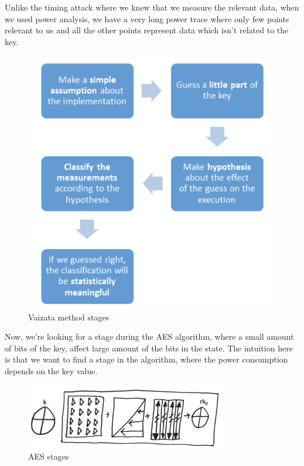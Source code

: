 Unlike the timing attack where we knew that we measure the relevant data, when we used power analysis, we have a very long power trace where only few points relevant to us and all the other points represent data which isn't related to the key.

\begin{figure}[!ht]
    \centering
    \includegraphics[height=0.9\textwidth]{images/Lecture6/vaizata.png}
    \caption{Vaizata method stages} \label{fig:vaizata}
\end{figure}

Now, we're looking for a stage during the AES algorithm, where a small amount of bits of the key, affect large amount of the bits in the state. The intuition here is that we want to find a stage in the algorithm, where the power consumption depends on the key value.

\begin{figure}[!ht]
    \centering
    \includegraphics[width=0.8\textwidth]{images/Lecture6/AES-stages-figure.png}
    \caption{AES stages} \label{fig:aes-stages}
\end{figure}

